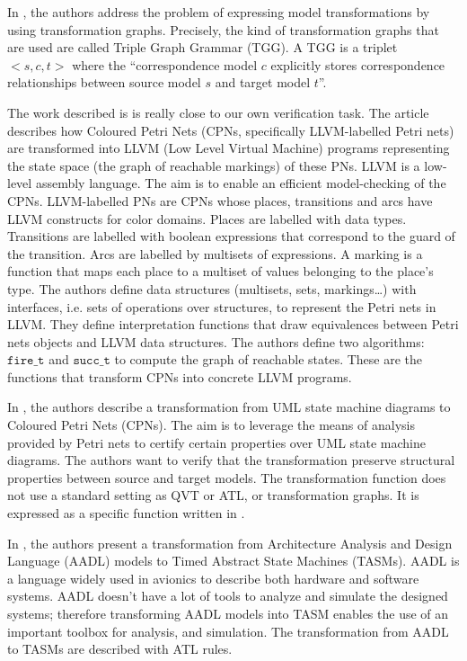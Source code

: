 \documentclass[pdflatex,sn-mathphys]{sn-jnl}%
\theoremstyle{thmstyleone}%
\theoremstyle{thmstyletwo}%
\theoremstyle{thmstylethree}%
\begin{document}
In \cite{Dyck2019}, the authors address the problem of expressing
model transformations by using transformation graphs. Precisely, the
kind of transformation graphs that are used are called Triple Graph
Grammar (TGG). A TGG is a triplet ${<}s,c,t{>}$ where the
``correspondence model $c$ explicitly stores correspondence
relationships between source model $s$ and target model $t$''.

The work described is \cite{Fronc2011} is really close to our own
verification task. The article describes how Coloured Petri Nets
(CPNs, specifically LLVM-labelled Petri nets) are transformed into
LLVM (Low Level Virtual Machine) programs representing the state space
(the graph of reachable markings) of these PNs. LLVM is a low-level
assembly language. The aim is to enable an efficient model-checking of
the CPNs.  LLVM-labelled PNs are CPNs whose places, transitions and
arcs have LLVM constructs for color domains. Places are labelled with
data types.  Transitions are labelled with boolean expressions that
correspond to the guard of the transition. Arcs are labelled by
multisets of expressions. A marking is a function that maps each place
to a multiset of values belonging to the place's type.  The authors
define data structures (multisets, sets, markings\dots) with
interfaces, i.e. sets of operations over structures, to represent the
Petri nets in LLVM.  They define interpretation functions that draw
equivalences between Petri nets objects and LLVM data structures.  The
authors define two algorithms: $\mathtt{fire\_t}$ and
$\mathtt{succ\_t}$ to compute the graph of reachable states.  These
are the functions that transform CPNs into concrete LLVM programs.

In \cite{Meghzili2017}, the authors describe a transformation from UML
state machine diagrams to Coloured Petri Nets (CPNs). The aim is to
leverage the means of analysis provided by Petri nets to certify
certain properties over UML state machine diagrams. The authors want
to verify that the transformation preserve structural properties
between source and target models. The transformation function does not
use a standard setting as QVT or ATL, or transformation graphs. It is
expressed as a specific function written in \isahol.

In \cite{Yang2014}, the authors present a transformation from
Architecture Analysis and Design Language (AADL) models to Timed
Abstract State Machines (TASMs). AADL is a language widely used in
avionics to describe both hardware and software systems. AADL doesn't
have a lot of tools to analyze and simulate the designed systems;
therefore transforming AADL models into TASM enables the use of an
important toolbox for analysis, and simulation. The transformation
from AADL to TASMs are described with ATL rules.
\end{document}
